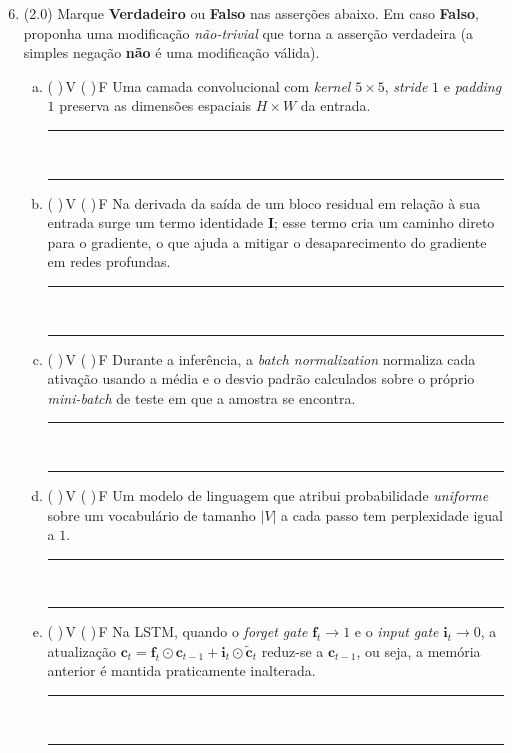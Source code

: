 \documentclass[11pt,a4paper]{article}
\begin{document}
\begin{enumerate}[1)]
\setcounter{enumi}{5}

\item (2.0) Marque \textbf{Verdadeiro} ou \textbf{Falso} nas asserções abaixo. Em caso \textbf{Falso}, proponha uma modificação \emph{não-trivial} que torna a asserção verdadeira (a simples negação \textbf{não} é uma modificação válida).

\begin{enumerate}[a)]
    \item ( )\,V \quad ( )\,F \quad Uma camada convolucional com \textit{kernel} $5 \times 5$, \textit{stride} $1$ e \textit{padding} $1$ preserva as dimensões espaciais $H \times W$ da entrada.\\[0.2em]
    \rule{\linewidth}{0.4pt}\\[0.2em]
    \rule{\linewidth}{0.4pt}

    \item ( )\,V \quad ( )\,F \quad Na derivada da saída de um bloco residual em relação à sua entrada surge um termo identidade $\mathbf{I}$; esse termo cria um caminho direto para o gradiente, o que ajuda a mitigar o desaparecimento do gradiente em redes profundas.\\[0.2em]
    \rule{\linewidth}{0.4pt}\\[0.2em]
    \rule{\linewidth}{0.4pt}

    \item ( )\,V \quad ( )\,F \quad Durante a inferência, a \textit{batch normalization} normaliza cada ativação usando a média e o desvio padrão calculados sobre o próprio \textit{mini-batch} de teste em que a amostra se encontra.\\[0.2em]
    \rule{\linewidth}{0.4pt}\\[0.2em]
    \rule{\linewidth}{0.4pt}

    \item ( )\,V \quad ( )\,F \quad Um modelo de linguagem que atribui probabilidade \emph{uniforme} sobre um vocabulário de tamanho $|V|$ a cada passo tem perplexidade igual a $1$.\\[0.2em]
    \rule{\linewidth}{0.4pt}\\[0.2em]
    \rule{\linewidth}{0.4pt}

    \item ( )\,V \quad ( )\,F \quad Na LSTM, quando o \textit{forget gate} $\mathbf{f}_t \to 1$ e o \textit{input gate} $\mathbf{i}_t \to 0$, a atualização $\mathbf{c}_t = \mathbf{f}_t \odot \mathbf{c}_{t-1} + \mathbf{i}_t \odot \tilde{\mathbf{c}}_t$ reduz-se a $\mathbf{c}_{t-1}$, ou seja, a memória anterior é mantida praticamente inalterada.\\[0.2em]
    \rule{\linewidth}{0.4pt}\\[0.2em]
    \rule{\linewidth}{0.4pt}
\end{enumerate}


\end{enumerate}
\end{document}
